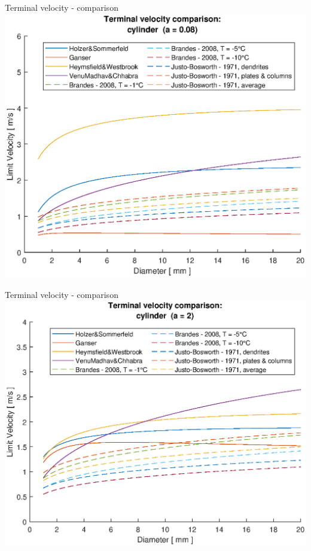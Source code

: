 \documentclass[11pt]{beamer}
\begin{document}
	\begin{frame}{Terminal velocity - comparison}
		\centering
		\includegraphics[height=\textheight,width=\textwidth,keepaspectratio] {vt_cylinder008.eps}		
	\end{frame}

	\begin{frame}{Terminal velocity - comparison}
		\centering
		\includegraphics[height=\textheight,width=\textwidth,keepaspectratio] {vt_cylinder2.eps}		
	\end{frame}
\end{document}
